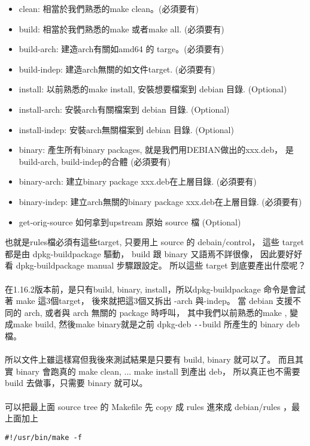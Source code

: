   \begin{itemize}
    \item clean: 相當於我們熟悉的make clean。(必須要有)
    \item build: 相當於我們熟悉的make 或者make all. (必須要有)
    \item build-arch: 建造arch有關如amd64 的 targe。(必須要有)
    \item build-indep: 建造arch無關的如文件target. (必須要有)
    \item install: 以前熟悉的make install, 安裝想要檔案到 debian 目錄. (Optional)
    \item install-arch: 安裝arch有關檔案到 debian 目錄. (Optional)
    \item install-indep: 安裝arch無關檔案到 debian 目錄. (Optional)
    \item binary: 產生所有binary packages, 就是我們用DEBIAN做出的xxx.deb，
      是build-arch, build-indep的合體 (必須要有)
    \item binary-arch: 建立binary package xxx.deb在上層目錄. (必須要有)
    \item binary-indep: 建立arch無關的binary package xxx.deb在上層目錄. (必須要有)
    \item get-orig-source 如何拿到upstream 原始 source 檔 (Optional)
  \end{itemize}
  也就是rules檔必須有這些target, 只要用上 source 的 debain/control，
  這些 target 都是由 dpkg-buildpackage 驅動， build 跟 binary 又語焉不詳很像，
  因此要好好看 dpkg-buildpackage manual 步驟跟設定。
  所以這些 target 到底要產出什麼呢？
  \\\\
  在1.16.2版本前，是只有build, binary, install，所以dpkg-buildpackage
  命令是會試著 make 這3個target， 後來就把這3個又拆出 -arch 與-indep。
  當 debian 支援不同的 arch, 或者與 arch 無關的 package 時呼叫，
  其中我們以前熟悉的make , 變成make build, 然後make binary就是之前
  dpkg-deb \verb=--=build 所產生的 binary deb 檔。
  \\\\
  所以文件上雖這樣寫但我後來測試結果是只要有 build, binary 就可以了。
  而且其實 binary 會跑真的 make clean, ... make install 到產出 deb，
  所以真正也不需要 build 去做事，只需要 binary 就可以。
  \\\\
  可以把最上面 source tree 的 Makefile 先 copy 成 rules 進來成 debian/rules
  ，最上面加上
  \begin{verbatim}
#!/usr/bin/make -f
  \end{verbatim}

